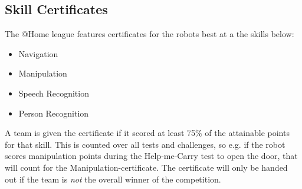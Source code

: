 \subsection{Skill Certificates}
\label{award:skill}
The @Home league features certificates for the robots best at a the skills below:
\begin{itemize}
   \item Navigation
   \item Manipulation
   \item Speech Recognition
   \item Person Recognition
  \end{itemize}
  
A team is given the certificate if it scored at least 75\% of the attainable points for that skill.
This is counted over all tests and challenges, so e.g. if the robot scores manipulation points during the Help-me-Carry test to open the door, that will count for the Manipulation-certificate.
The certificate will only be handed out if the team is \emph{not} the overall winner of the competition. 






